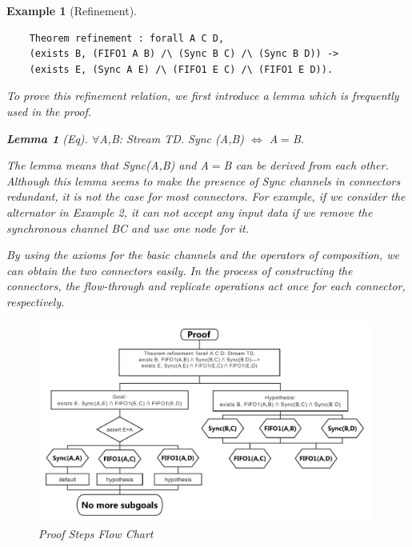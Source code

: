 \documentclass[3p,times]{elsarticle}
\newtheorem{example}{Example}[section]
\newtheorem{lemma}{Lemma}[section]
\begin{document}
\begin{example}[Refinement]
\begin{verbatim}
    Theorem refinement : forall A C D,
    (exists B, (FIFO1 A B) /\ (Sync B C) /\ (Sync B D)) ->
    (exists E, (Sync A E) /\ (FIFO1 E C) /\ (FIFO1 E D)).
\end{verbatim}



To prove this refinement relation, we first introduce a lemma which is frequently used in the proof.
\begin{lemma}[Eq]\label{lemma:eq}
$\forall$A,B: Stream TD.
  Sync (A,B) $\Leftrightarrow$ A$=$B.
\end{lemma}
The lemma means that \emph{Sync(A,B)} and \emph{A$=$B} can be derived
from each other. Although this lemma seems to make the presence of
Sync channels in connectors redundant, it is not the case for most
connectors. For example, if we consider
the alternator in Example 2, it can not accept any input data if we
remove the synchronous channel \emph{BC} and use one node for it.

By using the axioms for the basic channels and the operators of composition, we can obtain the two connectors easily.
In the process of constructing the connectors, the flow-through and replicate operations act once for each connector, respectively.


\begin{figure}[htbp]
\centering
\includegraphics[width=11cm]{Refinement.pdf}
\caption{Proof Steps Flow Chart}
\label{fig:equivalence}
\end{figure}


\end{example}
\end{document}
